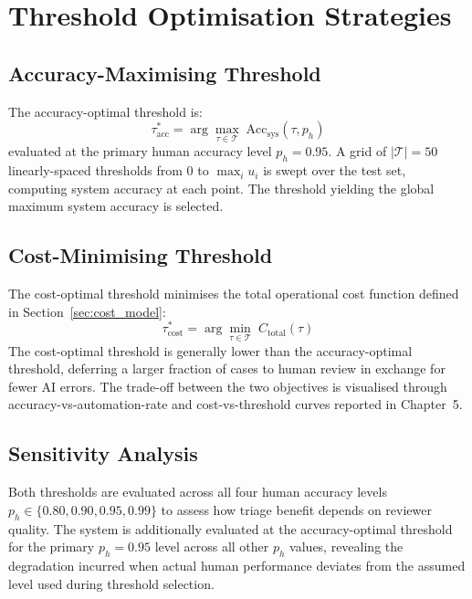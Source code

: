 \section{Threshold Optimisation Strategies}

\subsection{Accuracy-Maximising Threshold}

The accuracy-optimal threshold is:
\begin{equation}
    \tau^*_{\text{acc}} = \arg\max_{\tau \in \mathcal{T}} \; \text{Acc}_{\text{sys}}(\tau, p_h)
\end{equation}
evaluated at the primary human accuracy level $p_h = 0.95$. A grid of $|\mathcal{T}| = 50$ linearly-spaced thresholds from 0 to $\max_i u_i$ is swept over the test set, computing system accuracy at each point. The threshold yielding the global maximum system accuracy is selected.

\subsection{Cost-Minimising Threshold}

The cost-optimal threshold minimises the total operational cost function defined in Section~\ref{sec:cost_model}:
\begin{equation}
    \tau^*_{\text{cost}} = \arg\min_{\tau \in \mathcal{T}} \; C_{\text{total}}(\tau)
\end{equation}
The cost-optimal threshold is generally lower than the accuracy-optimal threshold, deferring a larger fraction of cases to human review in exchange for fewer AI errors. The trade-off between the two objectives is visualised through accuracy-vs-automation-rate and cost-vs-threshold curves reported in Chapter~5.

\subsection{Sensitivity Analysis}

Both thresholds are evaluated across all four human accuracy levels $p_h \in \{0.80, 0.90, 0.95, 0.99\}$ to assess how triage benefit depends on reviewer quality. The system is additionally evaluated at the accuracy-optimal threshold for the primary $p_h = 0.95$ level across all other $p_h$ values, revealing the degradation incurred when actual human performance deviates from the assumed level used during threshold selection.


